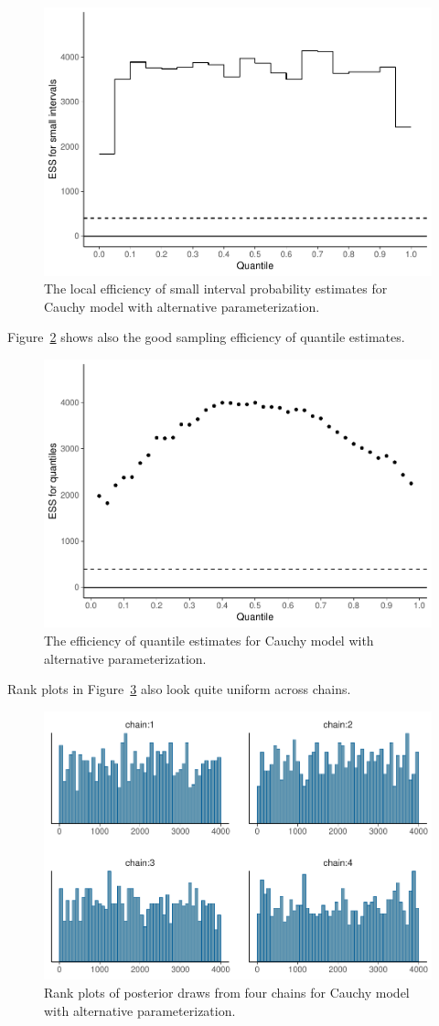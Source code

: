 \documentclass[american,]{article}
\begin{document}
\begin{figure}[tp]
  \centering
  \includegraphics[width=0.6\linewidth]{graphics/local-ess-fit-alt1-1.pdf}
  \caption{The local efficiency of small interval probability estimates for Cauchy model with alternative parameterization.}
\label{fig:local-ess-fit-alt1-1}
\end{figure}
Figure~\ref{fig:quantile-ess-alt1-1} shows also the good sampling efficiency
of quantile estimates.
\begin{figure}[tp]
  \centering
  \includegraphics[width=0.6\linewidth]{graphics/quantile-ess-fit-alt1-1.pdf}
  \caption{The efficiency of quantile estimates for Cauchy model with alternative parameterization.}
  \label{fig:quantile-ess-alt1-1}
\end{figure}
%
Rank plots in Figure~\ref{fig:hist-fit-alt1-1} also look quite uniform across chains.
\begin{figure}[tp]
  \centering
  \includegraphics[width=0.6\linewidth]{graphics/hist-fit-alt1-1.pdf}
  \caption{Rank plots of posterior draws from four chains for Cauchy model with alternative parameterization.}
  \label{fig:hist-fit-alt1-1}
\end{figure}
\end{document}
